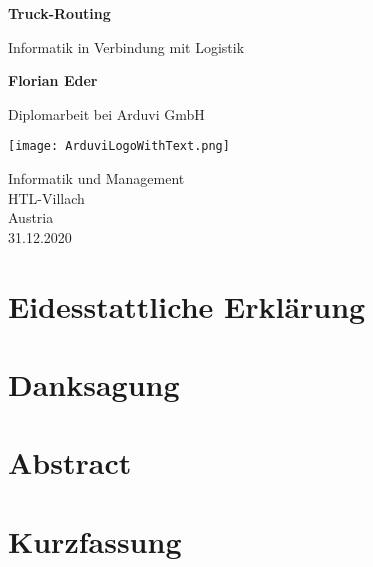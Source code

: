 \documentclass[12pt]{report}
\begin{document}
\begin{titlepage}
    \begin{center}
        \vspace*{1cm}
            
        \Huge
        \textbf{Truck-Routing}
            
        \vspace{0.5cm}
        \LARGE
        Informatik in Verbindung mit Logistik
            
        \vspace{1.5cm}
            
        \textbf{Florian Eder}
            
        \vspace{2.5cm}
            
        Diplomarbeit bei Arduvi GmbH
            
        \vspace{0.8cm}
            
        \texttt{[image: ArduviLogoWithText.png]}
        
        \vspace{0.8cm}

        \Large
        Informatik und Management\\
        HTL-Villach\\
        Austria\\
        31.12.2020
            
    \end{center}
\end{titlepage}

    \chapter*{Eidesstattliche Erklärung}
        

    \chapter*{Danksagung}
        

    \chapter*{Abstract}
        

    \chapter*{Kurzfassung}
        
\end{document}
